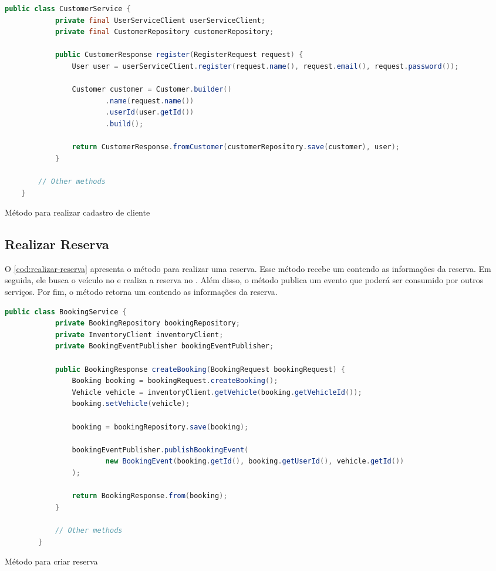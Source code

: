\begin{codigo}[H]
    \begin{lstlisting}[language=Java]
        public class CustomerService {
            private final UserServiceClient userServiceClient;
            private final CustomerRepository customerRepository;
        
            public CustomerResponse register(RegisterRequest request) {
                User user = userServiceClient.register(request.name(), request.email(), request.password());
        
                Customer customer = Customer.builder()
                        .name(request.name())
                        .userId(user.getId())
                        .build();
        
                return CustomerResponse.fromCustomer(customerRepository.save(customer), user);
            }

        // Other methods
    }
    \end{lstlisting}
    \caption{Método para realizar cadastro de cliente}
    \label{cod:cadastro-cliente}
\end{codigo}

\subsection{Realizar Reserva}
O \autoref{cod:realizar-reserva} apresenta o método para realizar uma reserva. Esse método recebe um  contendo as informações da reserva. Em seguida, ele busca o veículo no  e realiza a reserva no . Além disso, o método publica um evento que poderá ser consumido por outros serviços. Por fim, o método retorna um  contendo as informações da reserva.

\begin{codigo}[H]
    \begin{lstlisting}[language=Java]
        public class BookingService {
            private BookingRepository bookingRepository;
            private InventoryClient inventoryClient;
            private BookingEventPublisher bookingEventPublisher;

            public BookingResponse createBooking(BookingRequest bookingRequest) {
                Booking booking = bookingRequest.createBooking();
                Vehicle vehicle = inventoryClient.getVehicle(booking.getVehicleId());
                booking.setVehicle(vehicle);
        
                booking = bookingRepository.save(booking);
        
                bookingEventPublisher.publishBookingEvent(
                        new BookingEvent(booking.getId(), booking.getUserId(), vehicle.getId())
                );
        
                return BookingResponse.from(booking);
            }

            // Other methods
        }
    \end{lstlisting}
    \caption{Método para criar reserva}
    \label{cod:realizar-reserva}
\end{codigo}

